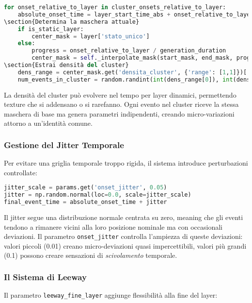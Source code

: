 \begin{lstlisting}[language=Python]
for onset_relative_to_layer in cluster_onsets_relative_to_layer:
    absolute_onset_time = layer_start_time_abs + onset_relative_to_layer
\section{Determina la maschera attuale}
    if is_static_layer:
        center_mask = layer['stato_unico']
    else:
        progress = onset_relative_to_layer / generation_duration
        center_mask = self._interpolate_mask(start_mask, end_mask, progress)
\section{Estrai densità del cluster}
    dens_range = center_mask.get('densita_cluster', {'range': [1,1]})['range']
    num_events_in_cluster = random.randint(int(dens_range[0]), int(dens_range[1]))
\end{lstlisting}

La densità del cluster può evolvere nel tempo per layer dinamici, permettendo texture che si addensano o si rarefanno. Ogni evento nel cluster riceve la stessa maschera di base ma genera parametri indipendenti, creando micro-variazioni attorno a un'identità comune.
\subsubsection{Gestione del Jitter Temporale}
Per evitare una griglia temporale troppo rigida, il sistema introduce perturbazioni controllate:

\begin{lstlisting}[language=Python]
jitter_scale = params.get('onset_jitter', 0.05)
jitter = np.random.normal(loc=0.0, scale=jitter_scale)
final_event_time = absolute_onset_time + jitter
\end{lstlisting}

Il jitter segue una distribuzione normale centrata su zero, meaning che gli eventi tendono a rimanere vicini alla loro posizione nominale ma con occasionali deviazioni. Il parametro \texttt{onset\_jitter} controlla l'ampiezza di queste deviazioni: valori piccoli (0.01) creano micro-deviazioni quasi impercettibili, valori più grandi (0.1) possono creare sensazioni di \textit{scivolamento} temporale.
\subsubsection{Il Sistema di Leeway}
Il parametro \texttt{leeway\_fine\_layer} aggiunge flessibilità alla fine del layer:

